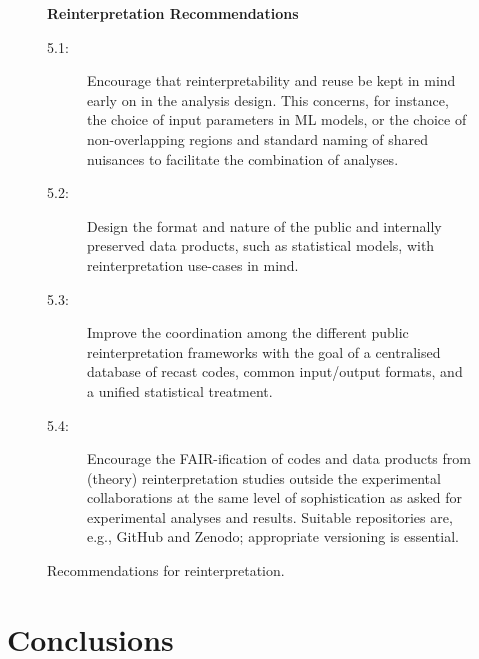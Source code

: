 \documentclass[11pt]{article}
\begin{document}
\begin{figure}[!ht]
\begin{tcolorbox}
\begin{center}
{\large \textbf{Reinterpretation Recommendations}}
\end{center}
%
\begin{description}
    \item[5.1:] Encourage that reinterpretability and reuse be kept in mind early on in the analysis design. This concerns, for instance, the choice of input parameters in \gls{ML} models, or the choice of non-overlapping regions and standard naming of shared nuisances to facilitate the combination of analyses.
    \item[5.2:] Design the format and nature of the public and internally preserved \glspl{data product}, such as statistical models, with reinterpretation use-cases in mind.
    \item[5.3:] Improve the coordination among the different public reinterpretation frameworks  with the goal of a centralised database of recast codes, common input/output formats, and a unified statistical treatment.
    \item[5.4:] Encourage the \gls{FAIR}-ification of codes and \glspl{data product} from (theory) reinterpretation studies outside the experimental collaborations at the same level of sophistication as asked for experimental analyses and results. Suitable repositories are, e.g., GitHub and Zenodo; appropriate versioning is essential.
\end{description}
\end{tcolorbox}
\caption{Recommendations for reinterpretation.}
\label{fig:recs_reinterpretation}
\end{figure}

\section{Conclusions}
\end{document}
